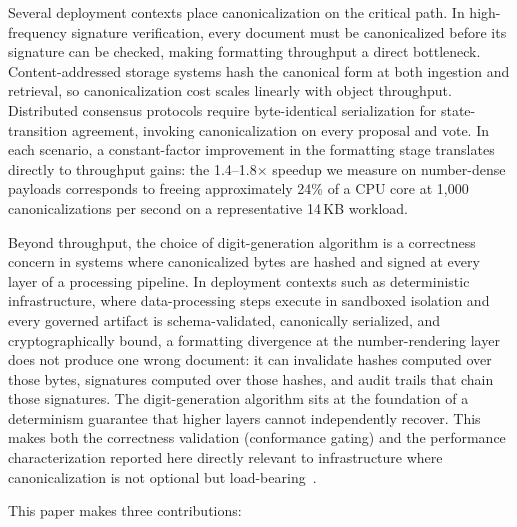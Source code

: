 Several deployment contexts place canonicalization on the critical path.
In high-frequency signature verification, every document must be
canonicalized before its signature can be checked, making formatting
throughput a direct bottleneck.  Content-addressed storage systems hash
the canonical form at both ingestion and retrieval, so canonicalization
cost scales linearly with object throughput.  Distributed consensus
protocols require byte-identical serialization for state-transition
agreement, invoking canonicalization on every proposal and vote.  In
each scenario, a constant-factor improvement in the formatting stage
translates directly to throughput gains: the 1.4--1.8$\times$ speedup
we measure on number-dense payloads corresponds to freeing
approximately 24\% of a CPU core at 1{,}000 canonicalizations per
second on a representative 14\,KB workload.

Beyond throughput, the choice of digit-generation algorithm is a
correctness concern in systems where canonicalized bytes are hashed and
signed at every layer of a processing pipeline.  In deployment contexts
such as deterministic infrastructure, where data-processing steps
execute in sandboxed isolation and every governed artifact is
schema-validated, canonically serialized, and cryptographically
bound, a formatting divergence at the number-rendering layer does not
produce one wrong document: it
can invalidate hashes computed over those bytes, signatures
computed over those hashes, and audit trails that chain those
signatures.  The digit-generation algorithm sits at the foundation of a
determinism guarantee that higher layers cannot independently recover.
This makes both the correctness validation (conformance gating) and the
performance characterization reported here directly relevant to
infrastructure where canonicalization is not optional but
load-bearing~\cite{rfc8785}.

This paper makes three contributions:

